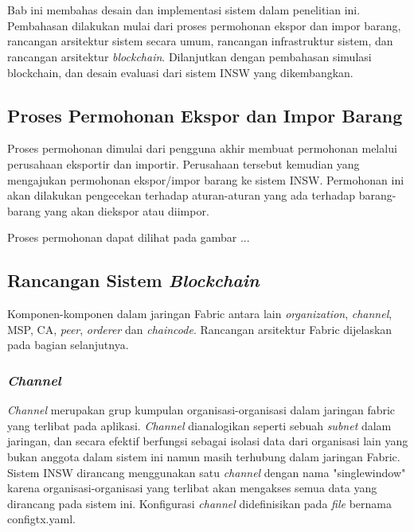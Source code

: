 \chapter{\babEmpat}
\label{bab:4}
Bab ini membahas desain dan implementasi sistem dalam penelitian ini. Pembahasan
dilakukan mulai dari proses permohonan ekspor dan impor barang, rancangan arsitektur sistem secara umum, rancangan infrastruktur sistem, dan rancangan arsitektur \textit{blockchain}. Dilanjutkan dengan pembahasan simulasi blockchain, dan desain evaluasi dari sistem INSW yang dikembangkan.

\section{Proses Permohonan Ekspor dan Impor Barang}
\label{sec:proses_do}
Proses permohonan dimulai dari pengguna akhir membuat permohonan melalui perusahaan eksportir dan importir. Perusahaan tersebut kemudian yang mengajukan permohonan ekspor/impor barang ke sistem INSW. Permohonan ini akan dilakukan pengecekan terhadap aturan-aturan yang ada terhadap barang-barang yang akan diekspor atau diimpor.

Proses permohonan dapat dilihat pada gambar ...

\section{Rancangan Sistem \textit{Blockchain}}
\label{sec:rancangansistem}

Komponen-komponen dalam jaringan Fabric antara lain \textit{organization}, \textit{channel}, MSP, CA, \textit{peer}, \textit{orderer} dan \textit{chaincode}. Rancangan arsitektur Fabric dijelaskan pada bagian selanjutnya.

\subsection{\textit{Channel}}
\label{subsec:channel}

\textit{Channel} merupakan grup kumpulan organisasi-organisasi dalam jaringan fabric yang terlibat pada aplikasi. \textit{Channel} dianalogikan seperti sebuah \textit{subnet} dalam jaringan, dan secara efektif berfungsi sebagai isolasi data dari organisasi lain yang bukan anggota dalam sistem ini namun masih terhubung dalam jaringan Fabric. Sistem INSW dirancang menggunakan satu \textit{channel} dengan nama "singlewindow" karena organisasi-organisasi yang terlibat akan mengakses semua data yang dirancang pada sistem ini. Konfigurasi \textit{channel} didefinisikan pada \textit{file} bernama configtx.yaml.

